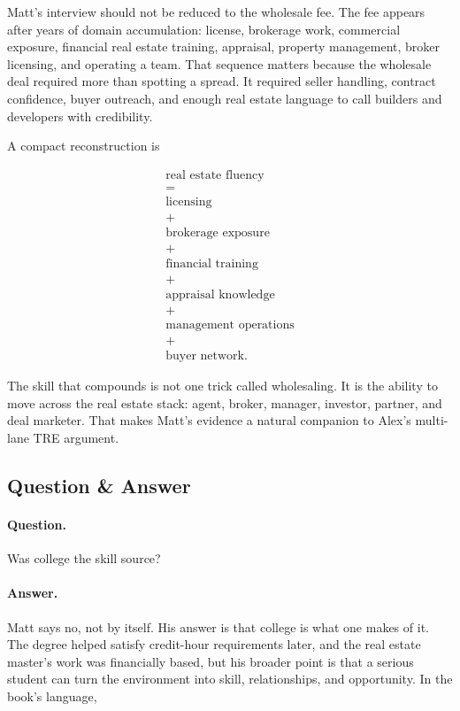 \documentclass[11pt,oneside]{book}
\begin{document}
Matt's interview should not be reduced to the wholesale fee. The fee appears after years of domain accumulation: license, brokerage work, commercial exposure, financial real estate training, appraisal, property management, broker licensing, and operating a team. That sequence matters because the wholesale deal required more than spotting a spread. It required seller handling, contract confidence, buyer outreach, and enough real estate language to call builders and developers with credibility.

A compact reconstruction is

\begin{equation}
\begin{gathered}
\text{real estate fluency}\\
=\\
\text{licensing}\\
+\\
\text{brokerage exposure}\\
+\\
\text{financial training}\\
+\\
\text{appraisal knowledge}\\
+\\
\text{management operations}\\
+\\
\text{buyer network}.
\end{gathered}
\end{equation}

The skill that compounds is not one trick called wholesaling. It is the ability to move across the real estate stack: agent, broker, manager, investor, partner, and deal marketer. That makes Matt's evidence a natural companion to Alex's multi-lane TRE argument.

\subsection{Question \& Answer}

\paragraph{Question.}
Was college the skill source?

\paragraph{Answer.}
Matt says no, not by itself. His answer is that college is what one makes of it. The degree helped satisfy credit-hour requirements later, and the real estate master's work was financially based, but his broader point is that a serious student can turn the environment into skill, relationships, and opportunity. In the book's language,
\end{document}
